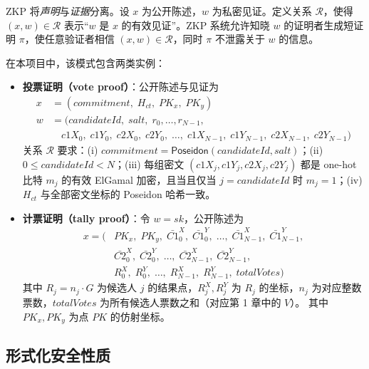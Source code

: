 ZKP 将\emph{声明}与\emph{证据}分离。设 $x$ 为公开陈述，$w$ 为私密见证。定义关系 $\mathcal{R}$，使得 $(x, w) \in \mathcal{R}$ 表示“$w$ 是 $x$ 的有效见证”。ZKP 系统允许知晓 $w$ 的证明者生成短证明 $\pi$，使任意验证者相信 $(x, w) \in \mathcal{R}$，同时 $\pi$ 不泄露关于 $w$ 的信息。

在本项目中，该模式包含两类实例：
\begin{itemize}
    \item \textbf{投票证明（vote proof）}：公开陈述与见证为
    \begin{align*}
    x &= (\mathit{commitment},\; H_{ct},\; PK_x,\; PK_y) \\
    w &= (\mathit{candidateId},\; \mathit{salt},\; r_0, \dots, r_{N-1},\\
       &\quad \mathit{c1X}_0,\; \mathit{c1Y}_0,\; \mathit{c2X}_0,\; \mathit{c2Y}_0,\; \dots,\; \mathit{c1X}_{N-1},\; \mathit{c1Y}_{N-1},\; \mathit{c2X}_{N-1},\; \mathit{c2Y}_{N-1})
    \end{align*}
    关系 $\mathcal{R}$ 要求：(i) $\mathit{commitment} = \mathsf{Poseidon}(\mathit{candidateId}, \mathit{salt})$；(ii) $0 \le \mathit{candidateId} < N$；(iii) 每组密文 $(\mathit{c1X}_j,\mathit{c1Y}_j,\mathit{c2X}_j,\mathit{c2Y}_j)$ 都是 one-hot 比特 $m_j$ 的有效 ElGamal 加密，且当且仅当 $j=\mathit{candidateId}$ 时 $m_j=1$；(iv) $H_{ct}$ 与全部密文坐标的 Poseidon 哈希一致。
    \item \textbf{计票证明（tally proof）}：令 $w = sk$，公开陈述为
    \begin{equation*}
        \begin{split}
        x = (&PK_x,\; PK_y,\; \bar{C1}^{X}_0,\; \bar{C1}^{Y}_0,\; \dots,\; \bar{C1}^{X}_{N-1},\; \bar{C1}^{Y}_{N-1},\\
             &\bar{C2}^{X}_0,\; \bar{C2}^{Y}_0,\; \dots,\; \bar{C2}^{X}_{N-1},\; \bar{C2}^{Y}_{N-1},\\
             &R^{X}_0,\; R^{Y}_0,\; \dots,\; R^{X}_{N-1},\; R^{Y}_{N-1},\; \mathit{totalVotes})
        \end{split}
    \end{equation*}
    其中 $R_j = n_j \cdot G$ 为候选人 $j$ 的结果点，$R^{X}_j, R^{Y}_j$ 为 $R_j$ 的坐标，$n_j$ 为对应整数票数，$\mathit{totalVotes}$ 为所有候选人票数之和（对应第 1 章中的 $V$）。
其中 $PK_x, PK_y$ 为点 $\mathit{PK}$ 的仿射坐标。
\end{itemize}

\subsection{形式化安全性质}

